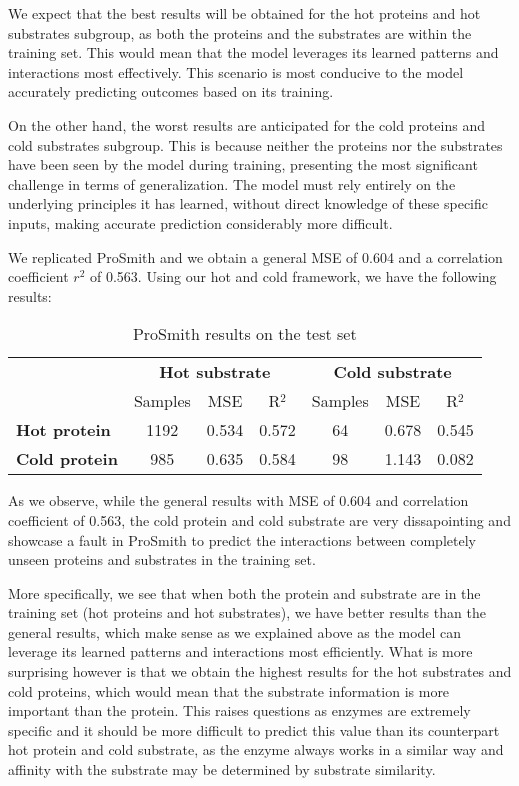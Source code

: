 We expect that the best results will be obtained for the hot proteins and hot substrates subgroup, 
as both the proteins and the substrates are within the training set. This would mean that 
the model leverages its learned patterns and interactions most effectively. 
This scenario is most conducive to the model accurately predicting outcomes based on its training.

On the other hand, the worst results are anticipated for the cold proteins and cold substrates subgroup. 
This is because neither the proteins nor the substrates have been seen by the model during training, 
presenting the most significant challenge in terms of generalization. The model must rely entirely 
on the underlying principles it has learned, without direct knowledge of these specific inputs, 
making accurate prediction considerably more difficult.

We replicated ProSmith and we obtain a general MSE of 0.604 and a correlation coefficient $r^2$ of 0.563. Using our hot and cold framework, we have the following results:

\begin{table}[ht]
  \centering
  \begin{tabular}{lcccccc}
  \hline
   & \multicolumn{3}{c}{\textbf{Hot substrate}} & \multicolumn{3}{c}{\textbf{Cold substrate}} \\
   & Samples & MSE & R\(^2\) & Samples & MSE & R\(^2\) \\ \hline
  \textbf{Hot protein}  & 1192 & 0.534 & 0.572 & 64 & 0.678 & 0.545 \\
  \textbf{Cold protein} & 985 & 0.635 & 0.584 & 98 & 1.143 & 0.082 \\ \hline
  \end{tabular}
  \caption{ProSmith results on the test set}
  \label{tab:prosmith_results}
\end{table}

As we observe, while the general results with MSE of 0.604 and correlation coefficient of 0.563, the
cold protein and cold substrate are very dissapointing and showcase a fault in ProSmith to predict the
interactions between completely unseen proteins and substrates in the training set.

More specifically, we see that when both the protein and substrate are in the training set (hot proteins and hot substrates), we have better results than the general results, which make sense as we explained above as the model can leverage its learned patterns and interactions most efficiently. What is more surprising however is that we obtain the highest results for the hot substrates and cold proteins, which would mean that the substrate information is more important than the protein. This raises questions as enzymes are extremely specific and it should be more difficult to predict this value than its counterpart hot protein and cold substrate, as the enzyme always works in a similar way and affinity with the substrate may be determined by substrate similarity.

